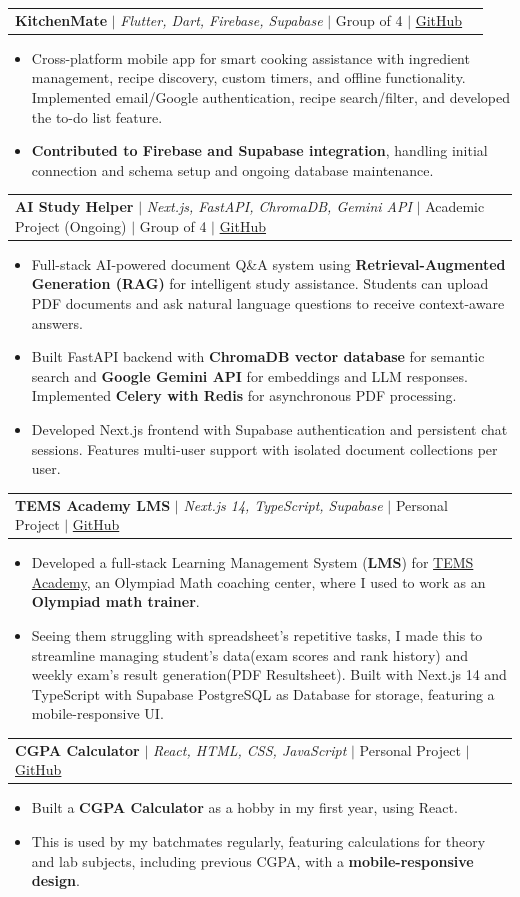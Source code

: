\documentclass[letterpaper,11pt]{article}
\makeatletter
\newcommand{\resumeItem}[1]{
  \item\small{\justifying #1 \vspace{-2pt}}
}
\newcommand{\resumeProjectHeading}[2]{
  \vspace{-2pt}\item
    \begin{tabular*}{0.97\textwidth}{l@{\extracolsep{\fill}}r}
      \small#1 & #2 \\
    \end{tabular*}\vspace{-7pt}
}
\newcommand{\resumeItemListStart}{\begin{itemize}}
\newcommand{\resumeItemListEnd}{\end{itemize}\vspace{-5pt}}
\makeatother
\begin{document}
  
\resumeProjectHeading
  {\textbf{KitchenMate} $|$ \emph{Flutter, Dart, Firebase, Supabase} $|$ Group of 4 $|$ \href{https://github.com/ninadgns/Android-Project-Pink-Flag}{\color{blue}GitHub}}{}
  \resumeItemListStart
    \resumeItem{Cross-platform mobile app for smart cooking assistance with ingredient management, recipe discovery, custom timers, and offline functionality. Implemented email/Google authentication, recipe search/filter, and developed the to-do list feature.}
    \resumeItem{\textbf{Contributed to Firebase and Supabase integration}, handling initial connection and schema setup and ongoing database maintenance.}
  \resumeItemListEnd

\resumeProjectHeading
  {\textbf{AI Study Helper} $|$ \emph{Next.js, FastAPI, ChromaDB, Gemini API} $|$ Academic Project (Ongoing) $|$ Group of 4 $|$ \href{https://github.com/Adha-KG/}{\color{blue}GitHub}}{}
  \resumeItemListStart
    \resumeItem{Full-stack AI-powered document Q\&A system using \textbf{Retrieval-Augmented Generation (RAG)} for intelligent study assistance. Students can upload PDF documents and ask natural language questions to receive context-aware answers.}
    \resumeItem{Built FastAPI backend with \textbf{ChromaDB vector database} for semantic search and \textbf{Google Gemini API} for embeddings and LLM responses. Implemented \textbf{Celery with Redis} for asynchronous PDF processing.}
    \resumeItem{Developed Next.js frontend with Supabase authentication and persistent chat sessions. Features multi-user support with isolated document collections per user.}
  \resumeItemListEnd

\resumeProjectHeading
  {\textbf{TEMS Academy LMS} $|$ \emph{Next.js 14, TypeScript, Supabase} $|$ Personal Project $|$ \href{https://github.com/ninadgns/TEMS-LMS}{\color{blue}GitHub}}{}
  \resumeItemListStart
    \resumeItem{Developed a full-stack Learning Management System (\textbf{LMS}) for \href{https://www.facebook.com/TEMS.MathAcademy}{TEMS Academy}, an Olympiad Math coaching center, where I used to work as an \textbf{Olympiad math trainer}.}
    \resumeItem{Seeing them struggling with spreadsheet's repetitive tasks, I made this to streamline managing student's data(exam scores and rank history) and weekly exam's result generation(PDF Resultsheet). Built with Next.js 14 and TypeScript with Supabase PostgreSQL as Database for storage, featuring a mobile-responsive UI.}
  \resumeItemListEnd

\resumeProjectHeading
  {\textbf{CGPA Calculator} $|$ \emph{React, HTML, CSS, JavaScript} $|$ Personal Project $|$ \href{https://github.com/ninadgns/ninadgns.github.io/tree/main/CGPASource}{\color{blue}GitHub}}{}
  \resumeItemListStart
    \resumeItem{Built a \textbf{CGPA Calculator} as a hobby in my first year, using React.}
    \resumeItem{This is used by my batchmates regularly, featuring calculations for theory and lab subjects, including previous CGPA, with a \textbf{mobile-responsive design}.}
  \resumeItemListEnd
\end{document}
